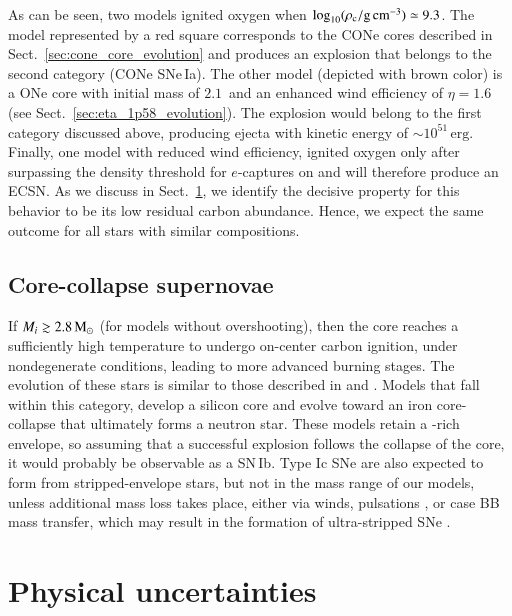 \documentclass[main.tex]{subfiles}
\begin{document}
As can be seen, two models ignited oxygen when $\log_{10} (\rho_{\mathrm{c}}/ \mathrm{g\,cm^{-3}})\simeq 9.3$. The model represented by a red square corresponds to the CONe cores described in Sect.~\ref{sec:cone_core_evolution} and produces an explosion that belongs to the second category (CONe SNe\,Ia). The other model (depicted with brown color) is a \seriestwo ONe core with initial mass of $2.1$\msun\ and an enhanced wind efficiency of $\eta = 1.6$ (see Sect.~\ref{sec:eta_1p58_evolution}). The explosion would belong to the first category discussed above, producing ejecta with kinetic energy of $\sim  10^{51}\, \text{erg}$. 
Finally, one \seriestwo model with reduced wind efficiency, ignited oxygen only after surpassing the density threshold for 
$e$-captures on  and will therefore produce an ECSN. As we discuss in Sect.~\ref{sec:physical_uncertainties}, we identify the decisive property for this behavior to be its low residual carbon abundance. Hence, we expect the same outcome  for all stars with  similar compositions. 

\newpage
\subsection{Core-collapse supernovae}\label{sec:ccsn_evolution}
If $ M_i  \gtrsim 2.8\mathrm{\,M_\odot}$ (for models without overshooting), then the core reaches a 
sufficiently high temperature to undergo on-center carbon ignition, under nondegenerate conditions, leading to more advanced burning stages. The evolution of these stars is similar to those described in \cite{Jones2013apj} and \cite{Woosley:2019sdf}.
Models that fall within this category, develop a silicon core and evolve toward an iron core-collapse that  ultimately forms a neutron 
star. These models retain a -rich envelope, so assuming that a successful explosion follows the collapse of the core, it would 
probably be observable  as a SN\,Ib. Type Ic SNe are also expected to 
form from stripped-envelope stars, but not in the mass range of our 
models, unless additional mass loss takes place, either via winds,  
pulsations \citep{Aguilera-Dena:2021abc}, or case BB mass transfer, 
which may result in the formation of ultra-stripped SNe  \citep{Tauris:2015xra}. 



\section{Physical uncertainties} \label{sec:physical_uncertainties}
\end{document}
